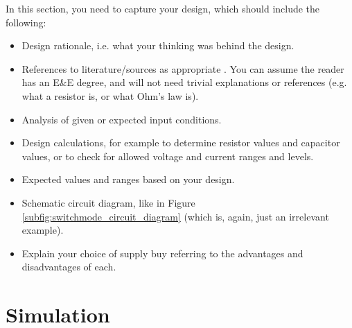 In this section, you need to capture your design, which should include the following: 
\begin{itemize}
  \item Design rationale, i.e. what your thinking was behind the design.
  \item References to literature/sources as appropriate \cite{WebsiteOpAmp}. You can assume the reader has an E\&E degree, and will not need trivial explanations or references (e.g. what a resistor is, or what Ohm's law is).   
  \item Analysis of given or expected input conditions. 
  \item Design calculations, for example to determine resistor values and capacitor values, or to check for allowed voltage and current ranges and levels. 
  \item Expected values and ranges based on your design. 
  \item Schematic circuit diagram, like in Figure \ref{subfig:switchmode_circuit_diagram} (which is, again, just an irrelevant example). 
  \item Explain your choice of supply buy referring to the advantages and disadvantages of each. 
\end{itemize}

\section{Simulation} \label{sec:pwr_simu}


